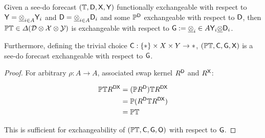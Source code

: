 \begin{lemma}\label{lem:f-ex2ex}
Given a see-do forecast $(\mathbb{T},\mathsf{D},\mathsf{X},\mathsf{Y})$ functionally exchangeable with respect to $\mathsf{Y}=\underline{\otimes}_{i\in A} \mathsf{Y}_i$ and $\mathsf{D}=\underline{\otimes}_{i\in A}\mathsf{D}_i$ and some $\mathbb{P}^{\mathsf{D}}$ exchangeable with respect to $\mathsf{D}$, then $\mathbb{P}\mathbb{T}\in \Delta(\mathcal{D}\otimes\mathcal{X}\otimes\mathcal{Y})$ is exchangeable with respect to $\mathsf{G}:=\underline{\otimes}_i\in A \mathsf{Y}_i\underline{\otimes}\mathsf{D}_i$. 

Furthermore, defining the trivial choice $\mathsf{C}:\{*\}\times X\times Y\to *$, $(\mathbb{P}\mathbb{T},\mathsf{C},\mathsf{G},\mathsf{X})$ is a see-do forecast exchangeable with respect to $\mathsf{G}$.
\end{lemma}

\begin{proof}

For arbitrary $\rho:A\to A$, associated swap kernel $R^{\mathsf{D}}$ and $R^{\mathsf{X}}$:

\begin{align}
    \mathbb{P}\mathbb{T} R^{\mathsf{D}\mathsf{X}} &= (\mathbb{P} R^{\mathsf{D}}) \mathbb{T} R^{\mathsf{D}\mathsf{X}}\\
                                  &= \mathbb{P}(R^{\mathsf{D}}\mathbb{T}R^{\mathsf{D}\mathsf{X}})\\
                                  &= \mathbb{P}\mathbb{T}
\end{align}

This is sufficient for exchangeability of $(\mathbb{P}\mathbb{T},\mathsf{C},\mathsf{G},\mathsf{O})$ with respect to $\mathsf{G}$.
\end{proof}

